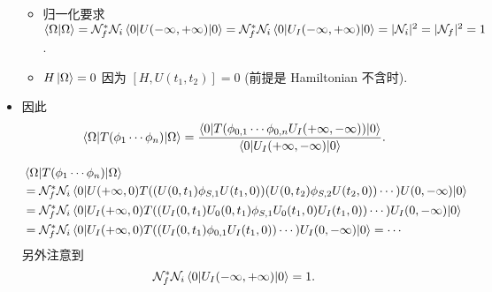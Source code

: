 \begin{itemize}
	\begin{itemize}
		\item 归一化要求 $\braket{\Omega | \Omega} = \mathcal{N}^*_f \mathcal{N}_i \braket{0 | U(- \infty, + \infty) | 0} = \mathcal{N}^*_f \mathcal{N}_i \braket{0 | U_I(- \infty, + \infty) | 0} = |\mathcal{N}_i|^2 = |\mathcal{N}_f|^2 = 1$.
		
		\item $H \ket{\Omega} = 0$ 因为 $[H, U(t_1, t_2)] = 0$ (前提是 Hamiltonian 不含时).
	\end{itemize}
	
	\item 因此
	\begin{equation}
		\braket{\Omega | T(\phi_1 \cdots \phi_n) | \Omega} = \frac{\braket{0 | T(\phi_{0, 1} \cdots \phi_{0, n} U_I(+ \infty, - \infty)) | 0}}{\braket{0 | U_I(+ \infty, - \infty) | 0}}.
	\end{equation}
	
	\begin{tcolorbox}[title=calculation:]
		\begin{align}
			& \braket{\Omega | T(\phi_1 \cdots \phi_n) | \Omega} \notag \\
			&= \mathcal{N}^*_f \mathcal{N}_i \braket{0 | U(+ \infty, 0) T((U(0, t_1) \phi_{S, 1} U(t_1, 0)) (U(0, t_2) \phi_{S, 2} U(t_2, 0)) \cdots) U(0, - \infty) | 0} \notag \\
			&= \mathcal{N}^*_f \mathcal{N}_i \braket{0 | U_I(+ \infty, 0) T((U_I(0, t_1) U_0(0, t_1) \phi_{S, 1} U_0(t_1, 0) U_I(t_1, 0)) \cdots) U_I(0, - \infty) | 0} \notag \\
			&= \mathcal{N}^*_f \mathcal{N}_i \braket{0 | U_I(+ \infty, 0) T((U_I(0, t_1) \phi_{0, 1} U_I(t_1, 0)) \cdots) U_I(0, - \infty) | 0} = \cdots
		\end{align}
		另外注意到
		\begin{equation}
			\mathcal{N}^*_f \mathcal{N}_i \braket{0 | U_I(- \infty, + \infty) | 0} = 1.
		\end{equation}
	\end{tcolorbox}
\end{itemize}
